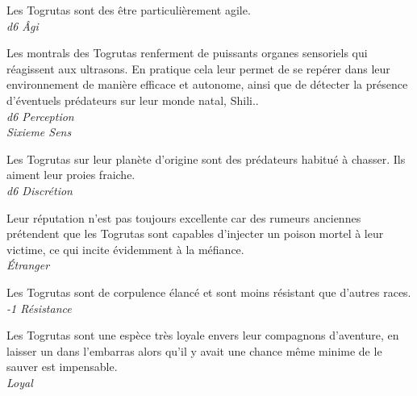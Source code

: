 \begin{description}[align=left]
\item [Agilité] 				%
		Les Togrutas sont des être particulièrement agile.\\
		\emph{d6 \^Agi}
\item [Montrals] 				%
		Les montrals des Togrutas renferment de puissants organes sensoriels qui réagissent aux ultrasons. En pratique cela leur permet de se repérer dans leur environnement de manière efficace et autonome, ainsi que de détecter la présence d'éventuels prédateurs sur leur monde natal, Shili..\\
		\emph{d6 Perception}\\
		\emph{Sixieme Sens}
\item [Predateur né] 			%
		Les Togrutas sur leur planète d'origine sont des prédateurs habitué à chasser. Ils aiment leur proies fraiche.\\
		\emph{d6 Discrétion}
\item [Mauvaise réputation] 	%
		Leur réputation n'est pas toujours excellente car des rumeurs anciennes prétendent que les Togrutas sont capables d'injecter un poison mortel à leur victime, ce qui incite évidemment à la méfiance.\\
		\emph{\'Etranger}
\item [Frèle] 					%
		Les Togrutas sont de corpulence élancé et sont moins résistant que d'autres races.\\
		\emph{-1 Résistance}
\item [Un pour tous] 			%
		Les Togrutas sont une espèce très loyale envers leur compagnons d'aventure, en laisser un dans l'embarras alors qu'il y avait une chance même minime de le sauver est impensable.\\
		\emph{Loyal}
\end{description}